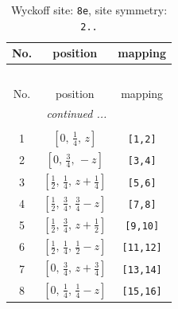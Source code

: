 \documentclass[fleqn,8pt]{jsarticle}
\begin{document}
\begin{longtable}{ccc}
\caption{Wyckoff site: {\tt 8e}, site symmetry: {\tt 2..}}
 \\
 \hline \hline
No. & position & mapping \\ \hline \endfirsthead

\multicolumn{2}{l}{\tablename\ \thetable{}} \\
 \hline \hline
No. & position & mapping \\ \hline \endhead

 \hline \hline
\multicolumn{2}{r}{\footnotesize\it continued ...} \\ \endfoot

 \hline \hline
\multicolumn{2}{r}{} \\ \endlastfoot

1 & $\left[ 0,\, \frac{1}{4},\, z \right]$ & {\tt [1,2]} \\ \hline
2 & $\left[ 0,\, \frac{3}{4},\, - z \right]$ & {\tt [3,4]} \\ \hline
3 & $\left[ \frac{1}{2},\, \frac{1}{4},\, z + \frac{1}{4} \right]$ & {\tt [5,6]} \\ \hline
4 & $\left[ \frac{1}{2},\, \frac{3}{4},\, \frac{3}{4} - z \right]$ & {\tt [7,8]} \\ \hline
5 & $\left[ \frac{1}{2},\, \frac{3}{4},\, z + \frac{1}{2} \right]$ & {\tt [9,10]} \\ \hline
6 & $\left[ \frac{1}{2},\, \frac{1}{4},\, \frac{1}{2} - z \right]$ & {\tt [11,12]} \\ \hline
7 & $\left[ 0,\, \frac{3}{4},\, z + \frac{3}{4} \right]$ & {\tt [13,14]} \\ \hline
8 & $\left[ 0,\, \frac{1}{4},\, \frac{1}{4} - z \right]$ & {\tt [15,16]} \\
\end{longtable}
\renewcommand{\arraystretch}{1.2}
\end{document}
